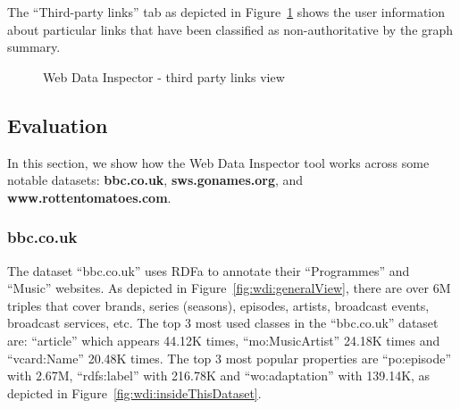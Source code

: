The ``Third-party links'' tab as depicted in Figure~\ref{fig:wdi:thirdPartyLinks} shows the user information about particular links that have been classified as non-authoritative by the graph summary.

\begin{figure}
	\centering
	\caption{Web Data Inspector - third party links view}
	\label{fig:wdi:thirdPartyLinks}
\end{figure}

\subsection{Evaluation}

In this section, we show how the Web Data Inspector tool works across some notable datasets: \textbf{bbc.co.uk}, \textbf{sws.gonames.org}, and \textbf{www.rottentomatoes.com}.

\subsubsection{bbc.co.uk}

The dataset ``bbc.co.uk'' uses RDFa to annotate their ``Programmes'' and ``Music'' websites. As depicted in Figure~\ref{fig:wdi:generalView}, there are over 6M triples that cover brands, series (seasons), episodes, artists, broadcast events, broadcast services, etc. The top 3 most used classes in the ``bbc.co.uk'' dataset are: ``article'' which appears 44.12K times, ``mo:MusicArtist'' 24.18K times and ``vcard:Name'' 20.48K times. The top 3 most popular properties are ``po:episode'' with 2.67M, ``rdfs:label'' with 216.78K and ``wo:adaptation'' with 139.14K, as depicted in Figure~\ref{fig:wdi:insideThisDataset}.


